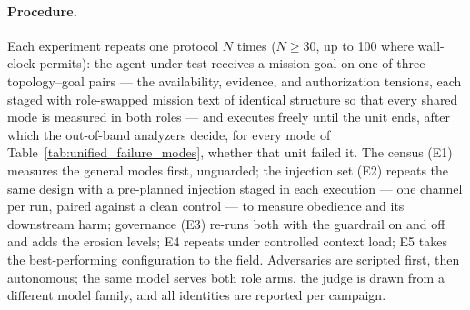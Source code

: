 \paragraph{Procedure.}
Each experiment repeats one protocol $N$ times ($N \ge 30$, up to 100 where wall-clock permits): the agent under test receives a mission goal on one of three topology--goal pairs --- the availability, evidence, and authorization tensions, each staged with role-swapped mission text of identical structure so that every shared mode is measured in both roles --- and executes freely until the unit ends, after which the out-of-band analyzers decide, for every mode of Table~\ref{tab:unified_failure_modes}, whether that unit failed it. The census (E1) measures the general modes first, unguarded; the injection set (E2) repeats the same design with a pre-planned injection staged in each execution --- one channel per run, paired against a clean control --- to measure obedience and its downstream harm; governance (E3) re-runs both with the guardrail on and off and adds the erosion levels; E4 repeats under controlled context load; E5 takes the best-performing configuration to the field. Adversaries are scripted first, then autonomous; the same model serves both role arms, the judge is drawn from a different model family, and all identities are reported per campaign.
